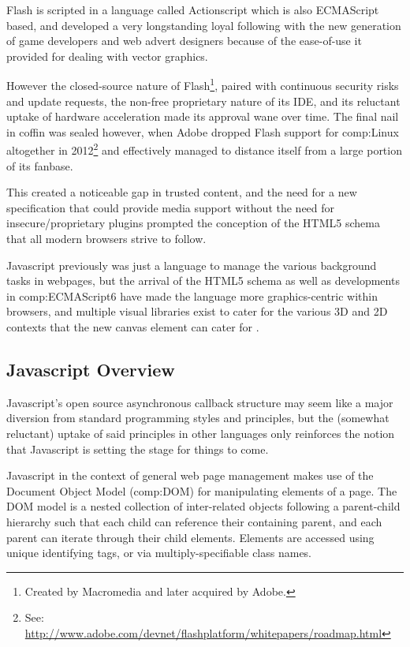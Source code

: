 Flash is scripted in a language called Actionscript which is also ECMAScript based, and developed a very longstanding loyal following with the new generation of game developers and web advert designers because of the ease-of-use it provided for dealing with vector graphics.

However the closed-source nature of Flash\footnote{Created by Macromedia and later acquired by Adobe.}, paired with continuous security risks and update requests, the non-free proprietary nature of its IDE, and its reluctant uptake of hardware acceleration made its approval wane over time. The final nail in coffin was sealed however, when Adobe dropped Flash support for \gls{comp:Linux} altogether in 2012\footnote{See: \url{http://www.adobe.com/devnet/flashplatform/whitepapers/roadmap.html}} and effectively managed to distance itself from a large portion of its fanbase.

This created a noticeable gap in trusted content, and the need for a new specification that could provide media support without the need for insecure/proprietary plugins prompted the conception of the HTML5 schema that all modern browsers strive to follow.

Javascript previously was just a language to manage the various background tasks in webpages, but the arrival of the HTML5 schema as well as developments in \gls{comp:ECMAScript6} have made the language more graphics-centric within browsers, and multiple visual libraries exist to cater for the various 3D and 2D contexts that the new canvas element can cater for \cite{ecmascript2011ecmascript}. 


\subsection{Javascript Overview}\label{ref:haplo:javaover}

Javascript's open source asynchronous callback structure may seem like a major diversion from standard programming styles and principles, but the (somewhat reluctant) uptake of said principles in other languages only reinforces the notion that Javascript is setting the stage for things to come.

Javascript in the context of general web page management makes use of the Document Object Model (\gls{comp:DOM}) for manipulating elements of a page. The DOM model is a nested collection of inter-related objects following a parent-child hierarchy such that each child can reference their containing parent, and each parent can iterate through their child elements. Elements are accessed using unique identifying tags, or via multiply-specifiable class names.

